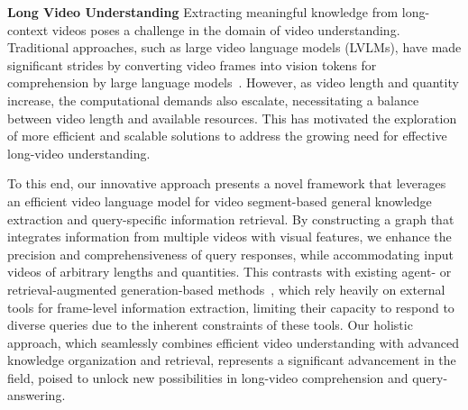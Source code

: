 \textbf{Long Video Understanding}
Extracting meaningful knowledge from long-context videos poses a challenge in the domain of video understanding. Traditional approaches, such as large video language models (LVLMs), have made significant strides by converting video frames into vision tokens for comprehension by large language models~\cite{LongVideoBench, LVBench, HourVideo, Llama-VID, Video-XL, LongVA, INTP}. However, as video length and quantity increase, the computational demands also escalate, necessitating a balance between video length and available resources. This has motivated the exploration of more efficient and scalable solutions to address the growing need for effective long-video understanding.

To this end, our innovative approach presents a novel framework that leverages an efficient video language model for video segment-based general knowledge extraction and query-specific information retrieval. By constructing a graph that integrates information from multiple videos with visual features, we enhance the precision and comprehensiveness of query responses, while accommodating input videos of arbitrary lengths and quantities. This contrasts with existing agent- or retrieval-augmented generation-based methods~\cite{VideoAgent, Video-Agent, Video-RAG, DrVideo}, which rely heavily on external tools for frame-level information extraction, limiting their capacity to respond to diverse queries due to the inherent constraints of these tools. Our holistic approach, which seamlessly combines efficient video understanding with advanced knowledge organization and retrieval, represents a significant advancement in the field, poised to unlock new possibilities in long-video comprehension and query-answering.